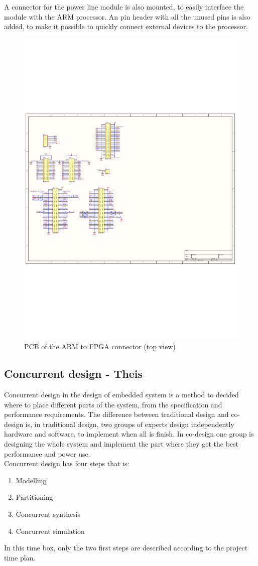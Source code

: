 A connector for the power line module is also mounted, to easily interface the module with the ARM processor. An pin header with all the unused pins is also added, to make it possible to quickly connect external devices to the processor. 
\begin{figure}[H]
	\begin{centering}
		 \includegraphics[height=0.8\textwidth,page=2,angle=90]{images/dig_to_ea_v0_1}
		\caption{PCB of the ARM to FPGA connector (top view)}
	\end{centering}
\end{figure}

\subsection{Concurrent design - Theis}
Concurrent design in the design of embedded system is a method to decided where to place different parts of the system, from the specification and performance requirements. The difference between traditional design and co-design is, in traditional design, two groups of experts design independently hardware and software, to implement when all is finish. In co-design one group is designing the whole system and implement the part where they get the best performance and power use.\\
Concurrent design has four steps that is:
\begin{enumerate}
	\item Modelling
	\item Partitioning
	\item Concurrent synthesis
	\item Concurrent simulation
\end{enumerate}
In this time box, only the two first steps are described according to the project time plan.

